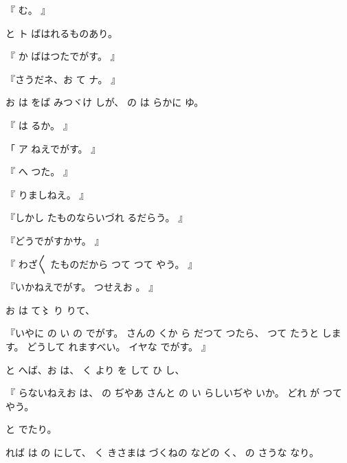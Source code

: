 『
む。
』

と
ト
ばはれるものあり。

『
か
ばはつたでがす。
』

『さうだネ、お
て
ナ。
』

お
は
をば
みつヾけ
しが、
の
は
らかに
ゆ。

『
は
るか。
』

「
ア
ねえでがす。
』

『
へ
つた。
』

『
りましねえ。
』

『しかし
たものならいづれ
るだらう。
』

『どうでがすかサ。
』

『
わざ〳〵
たものだから
つて
つて
やう。
』

『いかねえでがす。
つせえお
。
』

お
は
て〻
り
りて、

『いやに
の
い
の
でがす。
さんの
くか
ら
だつて
つたら、
つて
たうと
します。
どうして
れますべい。
イヤな
でがす。
』

と
へば、お
は、
く
より
を
して
ひ
し、

『
らないねえお
は、
の
ぢやあ
さんと
の
い
らしいぢや
いか。
どれ
が
つて
やう。

と
でたり。

れば
は
の
にして、
く
きさまは
づくねの
などの
く、
の
さうな
なり。

